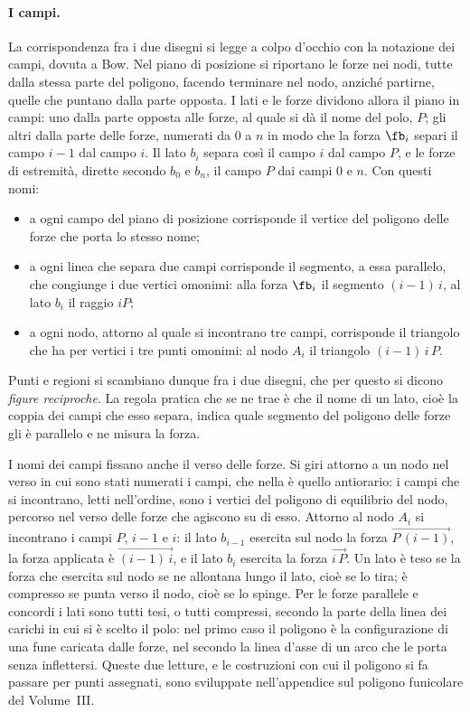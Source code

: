 \paragraph{I campi.}
La corrispondenza fra i due disegni si legge a colpo d'occhio con la notazione dei campi, dovuta
a Bow. Nel piano di posizione si riportano le forze nei nodi, tutte dalla stessa parte del
poligono, facendo terminare nel nodo, anziché partirne, quelle che puntano dalla parte opposta. I
lati e le forze dividono allora il piano in campi: uno dalla parte opposta alle forze, al quale si
dà il nome del polo, $P$; gli altri dalla parte delle forze, numerati da $0$ a $n$ in modo che la
forza $\fb_i$ separi il campo $i-1$ dal campo $i$. Il lato $b_i$ separa così il campo $i$ dal
campo $P$, e le forze di estremità, dirette secondo $b_0$ e $b_n$, il campo $P$ dai campi $0$ e
$n$. Con questi nomi:
\begin{itemize}
	\item a ogni campo del piano di posizione corrisponde il vertice del poligono delle forze che
	porta lo stesso nome;
	\item a ogni linea che separa due campi corrisponde il segmento, a essa parallelo, che congiunge
	i due vertici omonimi: alla forza $\fb_i$ il segmento $(i-1)\,i$, al lato $b_i$ il raggio $iP$;
	\item a ogni nodo, attorno al quale si incontrano tre campi, corrisponde il triangolo che ha per
	vertici i tre punti omonimi: al nodo $A_i$ il triangolo $(i-1)\,i\,P$.
\end{itemize}
Punti e regioni si scambiano dunque fra i due disegni, che per questo si dicono \emph{figure
reciproche}. La regola pratica che se ne trae è che il nome di un lato, cioè la coppia dei campi
che esso separa, indica quale segmento del poligono delle forze gli è parallelo e ne misura la
forza.

\begin{oss}
	\label{oss:verso_lettura_sgr}
	I nomi dei campi fissano anche il verso delle forze. Si giri attorno a un nodo nel verso in
	cui sono stati numerati i campi, che nella  è quello antiorario: i campi
	che si incontrano, letti nell'ordine, sono i vertici del poligono di equilibrio del nodo,
	percorso nel verso delle forze che agiscono su di esso. Attorno al nodo $A_i$ si incontrano i
	campi $P$, $i-1$ e $i$: il lato $b_{i-1}$ esercita sul nodo la forza
	$\overrightarrow{P\,(i-1)}$, la forza applicata è $\overrightarrow{(i-1)\,i}$, e il lato $b_i$
	esercita la forza $\overrightarrow{i\,P}$. Un lato è teso se la forza che esercita sul nodo se
	ne allontana lungo il lato, cioè se lo tira; è compresso se punta verso il nodo, cioè se lo
	spinge. Per le forze parallele e concordi i lati sono tutti tesi, o tutti compressi, secondo la
	parte della linea dei carichi in cui si è scelto il polo: nel primo caso il poligono è la
	configurazione di una fune caricata dalle forze, nel secondo la linea d'asse di un arco che le
	porta senza inflettersi. Queste due letture, e le costruzioni con cui il poligono si fa
	passare per punti assegnati, sono sviluppate nell'appendice sul poligono funicolare del
	Volume~III.
\end{oss}

